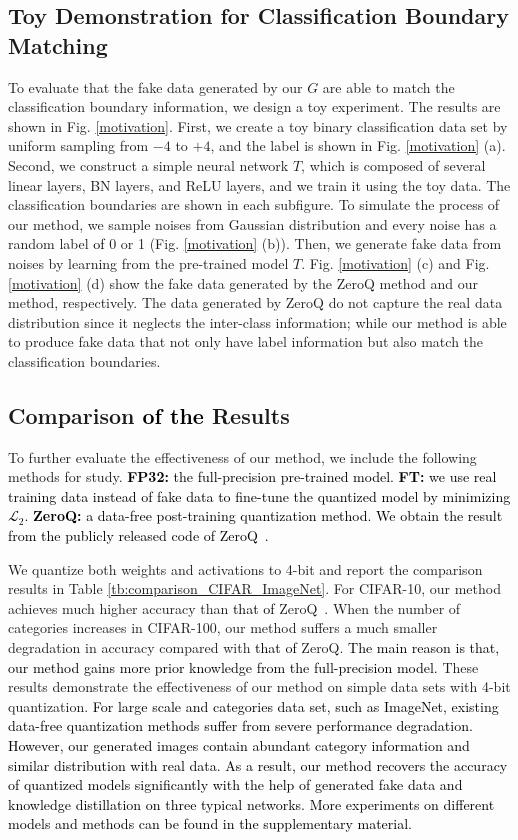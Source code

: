 \documentclass[runningheads]{llncs}
\def\mL{{\mathcal L}}
\def\lhk{\textcolor{black}}
\def\new{\textcolor{black}}
\begin{document}
\subsection{Toy Demonstration for Classification Boundary Matching}
To evaluate that the fake data generated by our $G$ are able to match the classification boundary information, we design a toy experiment. The results are shown in Fig. \ref{motivation}.
First, we create a toy binary classification data set by uniform sampling from $-4$ to $+4$, and the label is shown in Fig. \ref{motivation} (a). 
Second, we construct a simple neural network $T$, which is composed of several linear layers, BN layers, and ReLU layers, and we train it using the toy data. The classification boundaries are shown in each subfigure.
To simulate the process of our method, we sample noises from Gaussian distribution and every noise has a random label \new{of} 0 or 1 (Fig. \ref{motivation} (b)).
Then, we generate fake data from noises by learning from the pre-trained model $T$.
Fig. \ref{motivation} (c) and Fig. \ref{motivation} (d) show the fake data generated by the ZeroQ method and our method,  respectively. 
The data generated by ZeroQ do not capture the real data distribution since it neglects the inter-class information; while our method is able to produce fake data that not only have label information but also match the classification boundaries.


\subsection{Comparison \new{of the} Results}
To further evaluate the effectiveness of our method, we include the following methods for study. \lhk{\textbf{FP32:} the full-precision pre-trained model. \textbf{FT:} we use real training data instead of fake data to  fine-tune the quantized model by minimizing $\mL_{2}$. \textbf{ZeroQ:} a data-free post-training quantization method. We obtain the result from the publicly released code of ZeroQ~\cite{Cai_2020_CVPR}.}

We quantize both weights and activations to 4-bit and report the comparison results in Table \ref{tb:comparison_CIFAR_ImageNet}. For CIFAR-10, our method achieves much higher accuracy than \new{that of} ZeroQ~\cite{Cai_2020_CVPR}. When the number of categories increases in CIFAR-100, our method suffers a much smaller degradation in accuracy compared with \new{that of} ZeroQ. \lhk{The main reason is that, our method gains more prior knowledge from the full-precision model.} These results demonstrate the effectiveness of our method on simple data sets with 4-bit quantization. 
\lhk{\new{For} large scale and categories data set\new{, such as} ImageNet, existing data-free quantization methods suffer from severe performance degradation. However, our generated images contain abundant category information and similar distribution with real data. As a result, our method recovers the accuracy of quantized models significantly with the help of generated fake data and knowledge distillation on three typical networks.}
\new{More experiments on different models and methods can be found in the supplementary material.}
\end{document}
